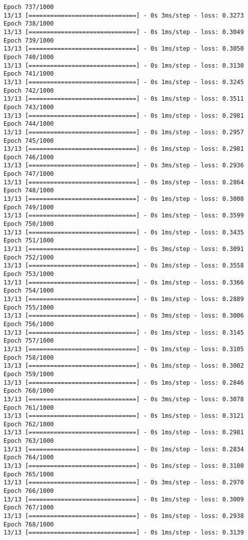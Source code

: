 \documentclass[11pt]{article}
\begin{document}
\begin{Verbatim}[commandchars=\\\{\}]
Epoch 737/1000
13/13 [==============================] - 0s 3ms/step - loss: 0.3273
Epoch 738/1000
13/13 [==============================] - 0s 1ms/step - loss: 0.3049
Epoch 739/1000
13/13 [==============================] - 0s 1ms/step - loss: 0.3050
Epoch 740/1000
13/13 [==============================] - 0s 1ms/step - loss: 0.3130
Epoch 741/1000
13/13 [==============================] - 0s 1ms/step - loss: 0.3245
Epoch 742/1000
13/13 [==============================] - 0s 1ms/step - loss: 0.3511
Epoch 743/1000
13/13 [==============================] - 0s 1ms/step - loss: 0.2981
Epoch 744/1000
13/13 [==============================] - 0s 1ms/step - loss: 0.2957
Epoch 745/1000
13/13 [==============================] - 0s 1ms/step - loss: 0.2981
Epoch 746/1000
13/13 [==============================] - 0s 3ms/step - loss: 0.2936
Epoch 747/1000
13/13 [==============================] - 0s 1ms/step - loss: 0.2864
Epoch 748/1000
13/13 [==============================] - 0s 1ms/step - loss: 0.3008
Epoch 749/1000
13/13 [==============================] - 0s 1ms/step - loss: 0.3599
Epoch 750/1000
13/13 [==============================] - 0s 1ms/step - loss: 0.3435
Epoch 751/1000
13/13 [==============================] - 0s 3ms/step - loss: 0.3091
Epoch 752/1000
13/13 [==============================] - 0s 1ms/step - loss: 0.3558
Epoch 753/1000
13/13 [==============================] - 0s 1ms/step - loss: 0.3366
Epoch 754/1000
13/13 [==============================] - 0s 1ms/step - loss: 0.2889
Epoch 755/1000
13/13 [==============================] - 0s 3ms/step - loss: 0.3006
Epoch 756/1000
13/13 [==============================] - 0s 1ms/step - loss: 0.3145
Epoch 757/1000
13/13 [==============================] - 0s 1ms/step - loss: 0.3105
Epoch 758/1000
13/13 [==============================] - 0s 1ms/step - loss: 0.3002
Epoch 759/1000
13/13 [==============================] - 0s 1ms/step - loss: 0.2846
Epoch 760/1000
13/13 [==============================] - 0s 3ms/step - loss: 0.3078
Epoch 761/1000
13/13 [==============================] - 0s 1ms/step - loss: 0.3121
Epoch 762/1000
13/13 [==============================] - 0s 1ms/step - loss: 0.2981
Epoch 763/1000
13/13 [==============================] - 0s 1ms/step - loss: 0.2834
Epoch 764/1000
13/13 [==============================] - 0s 1ms/step - loss: 0.3100
Epoch 765/1000
13/13 [==============================] - 0s 3ms/step - loss: 0.2970
Epoch 766/1000
13/13 [==============================] - 0s 1ms/step - loss: 0.3009
Epoch 767/1000
13/13 [==============================] - 0s 1ms/step - loss: 0.2938
Epoch 768/1000
13/13 [==============================] - 0s 1ms/step - loss: 0.3139

\end{Verbatim}
\end{document}
